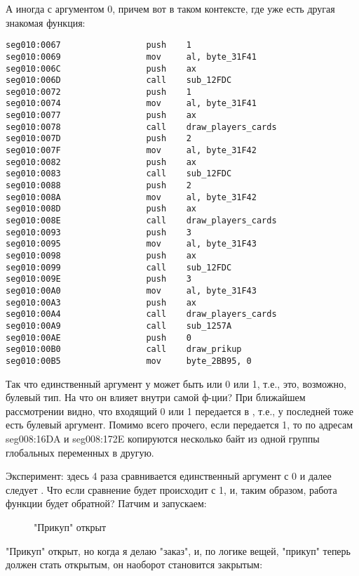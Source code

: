 А иногда с аргументом 0, причем вот в таком контексте, где уже есть другая знакомая функция:

\begin{lstlisting}[style=customasmx86]
seg010:0067                 push    1
seg010:0069                 mov     al, byte_31F41
seg010:006C                 push    ax
seg010:006D                 call    sub_12FDC
seg010:0072                 push    1
seg010:0074                 mov     al, byte_31F41
seg010:0077                 push    ax
seg010:0078                 call    draw_players_cards
seg010:007D                 push    2
seg010:007F                 mov     al, byte_31F42
seg010:0082                 push    ax
seg010:0083                 call    sub_12FDC
seg010:0088                 push    2
seg010:008A                 mov     al, byte_31F42
seg010:008D                 push    ax
seg010:008E                 call    draw_players_cards
seg010:0093                 push    3
seg010:0095                 mov     al, byte_31F43
seg010:0098                 push    ax
seg010:0099                 call    sub_12FDC
seg010:009E                 push    3
seg010:00A0                 mov     al, byte_31F43
seg010:00A3                 push    ax
seg010:00A4                 call    draw_players_cards
seg010:00A9                 call    sub_1257A
seg010:00AE                 push    0
seg010:00B0                 call    draw_prikup
seg010:00B5                 mov     byte_2BB95, 0
\end{lstlisting}

Так что единственный аргумент у  может быть или 0 или 1, т.е., это, возможно, булевый тип.
На что он влияет внутри самой ф-ции?
При ближайшем рассмотрении видно, что входящий 0 или 1 передается в , т.е., у последней тоже есть
булевый аргумент.
Помимо всего прочего, если передается 1, то по адресам seg008:16DA и seg008:172E копируются несколько байт
из одной группы глобальных переменных в другую.

Эксперимент: здесь 4 раза сравнивается единственный аргумент с 0 и далее следует .
Что если сравнение будет происходит с 1, и, таким образом, работа функции  будет обратной?
Патчим и запускаем:

\begin{figure}[H]
\centering
{}
\caption{"Прикуп" открыт}
\end{figure}

"Прикуп" открыт, но когда я делаю "заказ", и, по логике вещей, "прикуп" теперь должен стать открытым,
он наоборот становится закрытым:

